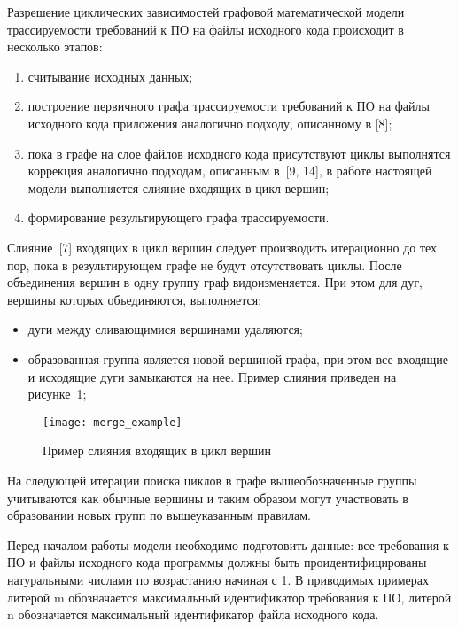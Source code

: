 Разрешение циклических зависимостей графовой математической модели трассируемости требований к ПО на файлы исходного кода происходит в несколько этапов:
\begin{enumerate}
    \item считывание исходных данных;
    \item построение первичного графа трассируемости требований к ПО на файлы исходного кода приложения аналогично подходу, описанному в [8];
    \item пока в графе на слое файлов исходного кода присутствуют циклы выполнятся коррекция аналогично подходам, описанным в~[9, 14], в работе настоящей модели выполняется слияние входящих в цикл вершин;
    \item формирование результирующего графа трассируемости.
\end{enumerate}

Слияние~[7] входящих в цикл вершин следует производить итерационно до тех пор, пока в результирующем графе не будут отсутствовать циклы. После объединения вершин в одну группу граф видоизменяется. При этом для дуг, вершины которых объединяются, выполняется:
\begin{itemize}
    \item дуги между сливающимися вершинами удаляются;
    \item образованная группа является новой вершиной графа, при этом все входящие и исходящие дуги замыкаются на нее. Пример слияния приведен на рисунке~\ref{fig:merge_example};
\end{itemize}

\begin{figure}[H]
    \centering
    \texttt{[image: merge\_example]}
    \caption{Пример слияния входящих в цикл вершин}
    \label{fig:merge_example}
\end{figure}

На следующей итерации поиска циклов в графе вышеобозначенные группы учитываются как обычные вершины и таким образом могут участвовать в образовании новых групп по вышеуказанным правилам.

Перед началом работы модели необходимо подготовить данные: все требования к ПО и файлы исходного кода программы должны быть проидентифицированы натуральными числами по возрастанию начиная с 1. В приводимых примерах литерой m обозначается максимальный идентификатор требования к ПО, литерой n обозначается максимальный идентификатор файла исходного кода.

